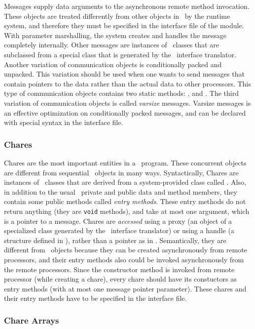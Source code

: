 Messages supply data arguments to the asynchronous remote method invocation.
These objects are treated differently from other objects in \charmpp\ by the
runtime system, and therefore they must be specified in the interface file
of the module.  With parameter marshalling, the system creates and handles
the message completely internally. Other messages are instances of \CC\
classes that are subclassed from a special class that is generated by the
\charmpp\ interface translator.  Another variation of communication objects
is conditionally packed and unpacked. This variation should be used when one
wants to send messages that contain pointers to the data rather than the
actual data to other processors. This type of communication objects contains
two static methods: \kw{pack}, and \kw{unpack}. The third variation of
communication objects is called {\em varsize} messages. Varsize messages is
an effective optimization on conditionally packed messages, and can be
declared with special syntax in the interface file.

\subsubsection{Chares}

Chares are the most important entities in a \charmpp\ program. These concurrent
objects are different from sequential \CC\ objects in many ways. Syntactically,
Chares are instances of \CC\  classes that are derived from a system-provided
class called \kw{Chare}. Also, in addition to the usual \CC\ private and public
data and method members, they contain some public methods called {\em entry
methods}. These entry methods do not return anything (they are {\tt void}
methods), and take at most one argument, which is a pointer to a message.
Chares are {\em accessed} using a proxy (an object of a specialized class
generated by the \charmpp\ interface translator) or using a handle (a \kw{
CkChareID} structure defined in \charmpp), rather than a pointer as in \CC.
Semantically, they are different from \CC\ objects because they can be created
asynchronously from remote processors, and their entry methods also could be
invoked asynchronously from the remote processors. Since the constructor method
is invoked from remote processor (while creating a chare), every chare should
have its constuctors as entry methods (with at most one message pointer
parameter). These chares and their entry methods have to be specified in the
interface file.

\subsubsection{Chare Arrays}

